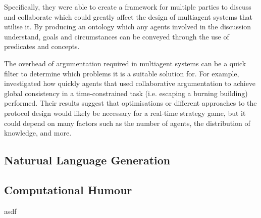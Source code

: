 \documentclass[conference]{IEEEtran}
\begin{document}
Specifically, they were able to create a framework for multiple parties to discuss and collaborate which could greatly affect the design of multiagent systems that utilise it. By producing an ontology which any agents involved in the discussion understand, goals and circumstances can be conveyed through the use of predicates and concepts.

The overhead of argumentation required in multiagent systems can be a quick filter to determine which problems it is a suitable solution for. For example, \cite{argumentationcontext} investigated how quickly agents that used collaborative argumentation to achieve global consistency in a time-constrained task (i.e. escaping a burning building) performed. Their results suggest that optimisations or different approaches to the protocol design would likely be necessary for a real-time strategy game, but it could depend on many factors such as the number of agents, the distribution of knowledge, and more.

\subsection{Naturual Language Generation}



\subsection{Computational Humour}



\begin{thebibliography}{00}
		\bibitem asdf
\end{thebibliography}
\vspace{12pt}
\end{document}
